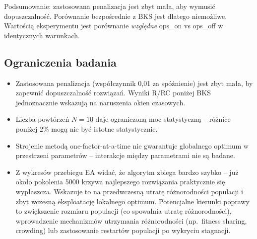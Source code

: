 \documentclass[11pt,a4paper]{article}
\begin{document}
Podsumowanie: zastosowana penalizacja jest zbyt mała, aby wymusić dopuszczalność.
Porównanie bezpośrednie z BKS jest dlatego niemożliwe. Wartością eksperymentu jest
porównanie \textit{względne} ops\_on vs ops\_off w identycznych warunkach.

\subsection{Ograniczenia badania}

\begin{itemize}
    \item Zastosowana penalizacja (współczynnik 0{,}01 za spóźnienie) jest zbyt
          mała, by zapewnić dopuszczalność rozwiązań. Wyniki R/RC poniżej BKS
          jednoznacznie wskazują na naruszenia okien czasowych.
    \item Liczba powtórzeń $N=10$ daje ograniczoną moc statystyczną -- różnice
          poniżej 2\% mogą nie być istotne statystycznie.
    \item Strojenie metodą one-factor-at-a-time nie gwarantuje globalnego optimum
          w przestrzeni parametrów -- interakcje między parametrami nie są badane.
    \item Z wykresów przebiegu EA widać, że algorytm zbiega bardzo szybko --
          już około pokolenia 5000 krzywa najlepszego rozwiązania praktycznie
          się wypłaszcza. Wskazuje to na przedwczesną utratę różnorodności populacji
          i zbyt wczesną eksploatację lokalnego optimum. Potencjalne kierunki poprawy
          to zwiększenie rozmiaru populacji (co spowalnia utratę różnorodności),
          wprowadzenie mechanizmów utrzymania różnorodności (np.\ fitness sharing,
          crowding) lub zastosowanie restartów populacji po wykryciu stagnacji.
\end{itemize}
\end{document}
